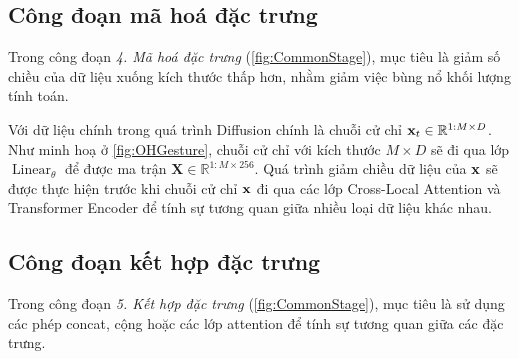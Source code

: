 

\subsection{Công đoạn mã hoá đặc trưng}

Trong công đoạn \textit{4. Mã hoá đặc trưng} (\autoref{fig:CommonStage}), mục tiêu là giảm số chiều của dữ liệu xuống kích thước thấp hơn, nhằm giảm việc bùng nổ khối lượng tính toán.

Với dữ liệu chính trong quá trình Diffusion chính là chuỗi cử chỉ $\mathbf{x}_t \in \mathbb{R}^{1:M \times D}$. Như minh hoạ ở \autoref{fig:OHGesture}, chuỗi cử chỉ với kích thước $M \times D$ sẽ đi qua lớp $\operatorname{Linear}_{\theta}$ để được ma trận $\mathbf{X} \in \mathbb{R}^{1:M \times 256}$. Quá trình giảm chiều dữ liệu của $\mathbf{x}$ sẽ được thực hiện trước khi chuỗi cử chỉ $\mathbf{x}$ đi qua các lớp Cross-Local Attention và Transformer Encoder để tính sự tương quan giữa nhiều loại dữ liệu khác nhau.


\subsection{Công đoạn kết hợp đặc trưng}
%



Trong công đoạn \textit{5. Kết hợp đặc trưng} (\autoref{fig:CommonStage}), mục tiêu là sử dụng các phép concat, cộng hoặc các lớp attention để tính sự tương quan giữa các đặc trưng.

